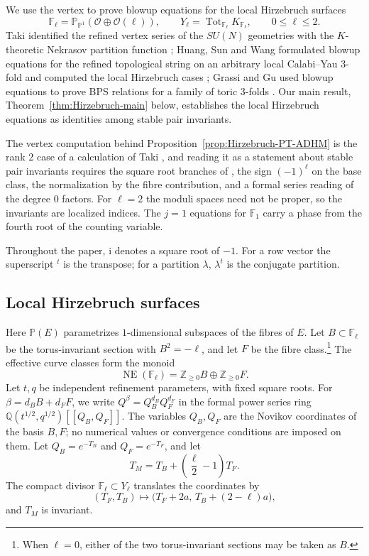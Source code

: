 \documentclass{amsart}
\theoremstyle{definition}
\numberwithin{equation}{section}
\newcommand{\Q}{\mathbb Q}
\newcommand{\Z}{\mathbb Z}
\newcommand{\cO}{\mathcal O}
\newcommand{\Tot}{\operatorname{Tot}}
\begin{document}
We use the vertex to prove blowup equations for the local Hirzebruch surfaces
\[
 \mathbb F_\ell=\mathbb P_{\mathbb P^1}(\cO\oplus\cO(\ell)),
 \qquad Y_\ell=\Tot_{\mathbb F_\ell}K_{\mathbb F_\ell},
 \qquad 0\leq\ell\leq2.
\]
Taki identified the refined vertex series of the \(SU(N)\) geometries with the \(K\)-theoretic Nekrasov partition function \cite{TakiRefined}; Huang, Sun and Wang formulated blowup equations for the refined topological string on an arbitrary local Calabi--Yau 3-fold and computed the local Hirzebruch cases \cite{HuangSunWang}; Grassi and Gu used blowup equations to prove BPS relations for a family of toric 3-folds \cite{GrassiGu}.  Our main result, Theorem~\ref{thm:Hirzebruch-main} below, establishes the local Hirzebruch equations as identities among stable pair invariants.

The vertex computation behind Proposition~\ref{prop:Hirzebruch-PT-ADHM} is the rank \(2\) case of a calculation of Taki \cite{TakiRefined}, and reading it as a statement about stable pair invariants requires the square root branches of \cite{Arbesfeld,KuhnLiuThimm}, the sign \((-1)^\ell\) on the base class, the normalization by the fibre contribution, and a formal series reading of the degree \(0\) factors.  For \(\ell=2\) the moduli spaces need not be proper, so the invariants are localized indices.  The \(j=1\) equations for \(\mathbb F_1\) carry a phase from the fourth root of the counting variable.

Throughout the paper, \(\mathrm i\) denotes a square root of \(-1\).  For a row vector the superscript \({}^t\) is the transpose; for a partition \(\lambda\), \(\lambda^t\) is the conjugate partition.

\subsection{Local Hirzebruch surfaces}
Here \(\mathbb P(E)\) parametrizes \(1\)-dimensional subspaces of the fibres of \(E\).  Let \(B\subset\mathbb F_\ell\) be the torus-invariant section with \(B^2=-\ell\), and let \(F\) be the fibre class.\footnote{When \(\ell=0\), either of the two torus-invariant sections may be taken as \(B\).}  The effective curve classes form the monoid
\[
 \operatorname{NE}(\mathbb F_\ell)
 =\Z_{\geq0}B\oplus\Z_{\geq0}F.
\]
Let \(t,q\) be independent refinement parameters, with fixed square roots.  For \(\beta=d_BB+d_FF\), we write \(Q^\beta=Q_B^{d_B}Q_F^{d_F}\) in the formal power series ring \(\Q(t^{1/2},q^{1/2})[[Q_B,Q_F]]\).  The variables \(Q_B,Q_F\) are the Novikov coordinates of the basis \(B,F\); no numerical values or convergence conditions are imposed on them.  Let \(Q_B=e^{-T_B}\) and \(Q_F=e^{-T_F}\), and let
\begin{equation}
 T_M=T_B+\left(\frac\ell2-1\right)T_F.
\label{eq:intro-fixed-coordinate}
\end{equation}
The compact divisor \(\mathbb F_\ell\subset Y_\ell\) translates the coordinates by
\[
 (T_F,T_B)\longmapsto\bigl(T_F+2a,\,T_B+(2-\ell)a\bigr),
\]
and \(T_M\) is invariant.
\end{document}
